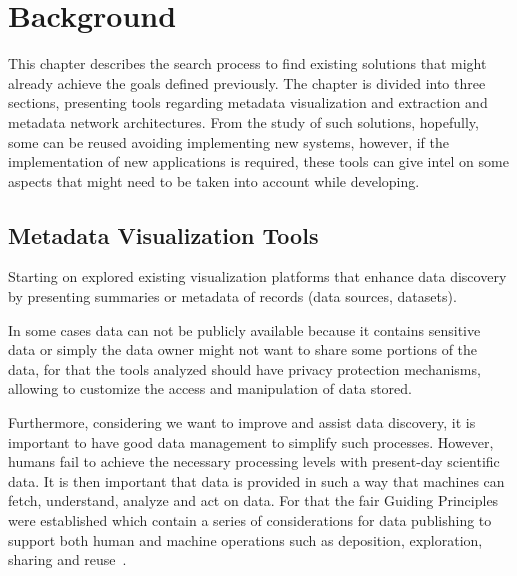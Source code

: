 \chapter{Background}
\label{chapter:background}
\graphicspath{{figs/02-background/}}

This chapter describes the search process to find existing solutions that might already achieve the goals defined previously.
The chapter is divided into three sections, presenting tools regarding metadata visualization and extraction and metadata network architectures.
From the study of such solutions, hopefully, some can be reused avoiding implementing new systems, however, if the implementation of new applications is required, these tools can give intel on some aspects that might need to be taken into account while developing.

\section{Metadata Visualization Tools} \label{sec:viz-tools}


Starting on explored existing visualization platforms that enhance data discovery
by presenting summaries or metadata of records (data sources, datasets).

In some cases data can not be publicly available because it contains sensitive data or
simply the data owner might not want to share some portions of the data, for that the
tools analyzed should have privacy protection mechanisms, allowing to customize the
access and manipulation of data stored.

Furthermore, considering we want to improve and assist data discovery, it is important to have good data management to simplify such processes.
However, humans fail to achieve the necessary processing levels with present-day
scientific data.
It is then important that data is provided in such a way that machines can fetch,
understand, analyze and act on data.
For that the \gls{fair} Guiding Principles were established which contain a series of considerations for data publishing to support both human and machine operations such as deposition, exploration, sharing and reuse~\cite{fair}.


